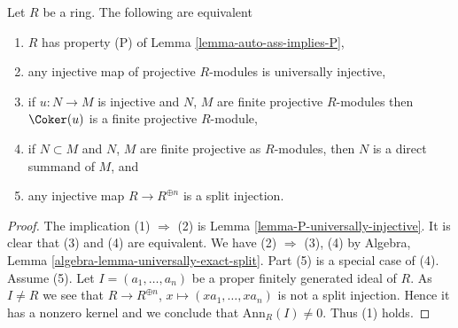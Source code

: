 \begin{lemma}
\label{lemma-P-fPD-zero}
Let $R$ be a ring. The following are equivalent
\begin{enumerate}
\item $R$ has property (P) of
Lemma \ref{lemma-auto-ass-implies-P},
\item any injective map of projective $R$-modules is
universally injective,
\item if $u : N \to M$ is injective and $N$, $M$ are finite projective
$R$-modules then $\Coker(u)$ is a finite projective $R$-module,
\item if $N \subset M$ and $N$, $M$ are finite projective as $R$-modules, then
$N$ is a direct summand of $M$, and
\item any injective map $R \to R^{\oplus n}$ is a split injection.
\end{enumerate}
\end{lemma}

\begin{proof}
The implication (1) $\Rightarrow$ (2) is
Lemma \ref{lemma-P-universally-injective}.
It is clear that (3) and (4) are equivalent.
We have (2) $\Rightarrow$ (3), (4) by
Algebra, Lemma \ref{algebra-lemma-universally-exact-split}.
Part (5) is a special case of (4).
Assume (5). Let $I = (a_1, \ldots, a_n)$ be a proper finitely generated
ideal of $R$. As $I \not = R$ we see that
$R \to R^{\oplus n}$, $x \mapsto (xa_1, \ldots, xa_n)$
is not a split injection. Hence it has a nonzero kernel and we conclude
that $\text{Ann}_R(I) \not = 0$. Thus (1) holds.
\end{proof}
